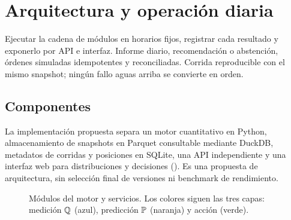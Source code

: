 \clearpage
\section{Arquitectura y operación diaria}\label{sec:arquitectura}

{Ejecutar la cadena de módulos en horarios fijos, registrar cada resultado y exponerlo por API e
interfaz.}
{Informe diario, recomendación o abstención, órdenes simuladas idempotentes y reconciliadas.}
{Corrida reproducible con el mismo snapshot; ningún fallo aguas arriba se convierte en orden.}

\subsection{Componentes}\label{sec:componentes}

La implementación propuesta separa un motor cuantitativo en Python, almacenamiento de snapshots en
Parquet consultable mediante DuckDB, metadatos de corridas y posiciones en SQLite, una API independiente y
una interfaz web para distribuciones y decisiones (). Es una propuesta de
arquitectura, sin selección final de versiones ni benchmark de rendimiento.

\begin{figure}[H]
\centering
\resizebox{\linewidth}{!}{}
\caption{Módulos del motor y servicios. Los colores siguen las tres capas: medición $\Q$ (azul),
predicción $\P$ (naranja) y acción (verde).}
\label{fig:arquitectura}
\end{figure}

